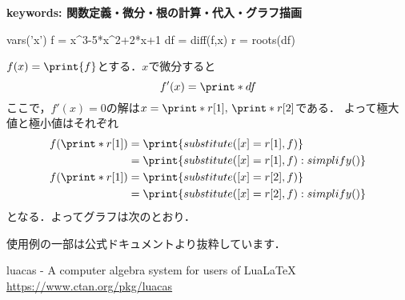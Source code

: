 \documentclass{jlreq}
\begin{document}
 {\bfseries\gtfamily keywords: 関数定義・微分・根の計算・代入・グラフ描画}

\begin{CAS}
	vars('x')
	f = x^3-5*x^2+2*x+1
	df = diff(f,x)
	r = roots(df)
\end{CAS}

$f(x)=\print{f}$とする．$x$で微分すると
\[f'(x)=\print*{df}\]
ここで，$f'(x)=0$の解は$\displaystyle x=\print*{r[1]},\,\print*{r[2]}$である．
よって極大値と極小値はそれぞれ
\begin{align*}
	f\qty(\print*{r[1]}) & =\print{substitute({[x]=r[1]},f)}            \\
	                     & =\print{substitute({[x]=r[1]},f):simplify()} \\
	f\qty(\print*{r[1]}) & =\print{substitute({[x]=r[2]},f)}            \\
	                     & =\print{substitute({[x]=r[2]},f):simplify()}
\end{align*}
となる．よってグラフは次のとおり．
\begin{figure}[H]
	\centering
\end{figure}


使用例の一部は公式ドキュメントより抜粋しています．

luacas - A computer algebra system for users of LuaLaTeX\quad
\url{https://www.ctan.org/pkg/luacas}
\end{document}
